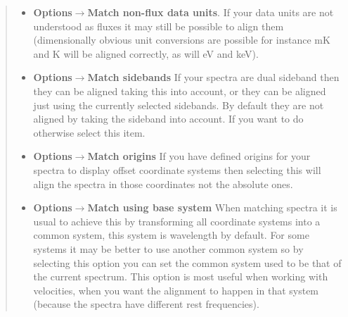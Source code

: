 \documentclass[twoside,11pt]{article}
\newcommand{\htmladdimg}[1]{}
\newcommand{\latexhtml}[2]{#1}
\renewcommand{\_}{\texttt{\symbol{95}}}
\newcommand{\SPLAT}{\textsf{SPLAT-VO}}
\newcommand{\inline}[1]
        {\latexhtml{\texttt{[image: sun243\_figures/\#1]}}
        {\htmladdimg[align=center]{#1.gif}}}
\newcommand{\submenuitem}[2]{\latexhtml{\textbf{#1$\rightarrow$#2}}{\textbf{#1->#2}}}
\newcommand{\ie}{\textit{i.e.}}
\begin{document}
\begin{quote}
\begin{itemize}
  Whether this works or not depends on whether the spectra that you have read
  in contain correct descriptions (or descriptions that \SPLAT\ can make good
  guesses about) of the spectral coordinates and data fluxes and whether the
  flux system is supported. If this doesn't work then check that your spectra
  have valid descriptions using the toolboxes in the main browser window for
  inspecting and setting spectral coordinates and data units
  (\inline{xunits} and \inline{yunits}).

  In the case of line identifier catalogues, these will also be transformed to
  the rest frame of the observed source (\ie\ they will be red or blue shifted
  if you have defined the source velocity as part of its coordinate system
  definition).

  This option is switched on by default. If your spectra do not need aligning
  switch if off for extra performance.

  \item \submenuitem{Options}{Match non-flux data units}.
  If your data units are not understood as fluxes it may still be possible to
  align them (dimensionally obvious unit conversions are possible for instance
  mK and K will be aligned correctly, as will eV and keV).

  \item \submenuitem{Options}{Match sidebands}
  If your spectra are dual sideband then they can be aligned taking this
  into account, or they can be aligned just using the currently selected
  sidebands. By default they are not aligned by taking the sideband into
  account.  If you want to do otherwise select this item.

  \item \submenuitem{Options}{Match origins}
  If you have defined origins for your spectra to display offset coordinate
  systems then selecting this will align the spectra in those coordinates
  not the absolute ones.

  \item \submenuitem{Options}{Match using base system}
  When matching spectra it is usual to achieve this by transforming all
  coordinate systems into a common system, this system is wavelength by
  default. For some systems it may be better to use another common system
  so by selecting this option you can set the common system used to be that of
  the current spectrum. This option is most useful when working with
  velocities, when you want the alignment to happen in that system
  (because the spectra have different rest frequencies).


\end{itemize}
\end{quote}
\end{document}
